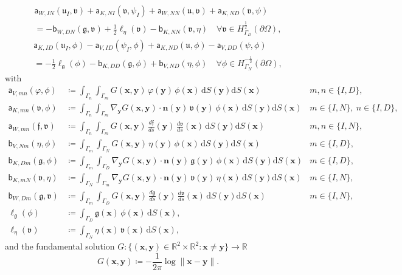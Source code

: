 \documentclass{article}
\theoremstyle{remark}
\newcommand{\aaa}{\mathsf{a}}
\newcommand{\bbb}{\mathsf{b}}
\newcommand{\x}{\boldsymbol{x}}
\newcommand{\y}{\boldsymbol{y}}
\newcommand{\dd}{\mathrm{d}}
\newcommand{\n}{\boldsymbol{n}}
\newcommand{\argu}{\mathfrak{u}}
\newcommand{\argv}{\mathfrak{v}}
\newcommand{\argf}{\mathfrak{f}}
\newcommand{\argg}{\mathfrak{g}}
\begin{document}
\begin{multline*}
    \aaa_{W,IN}(\argu_I,\argv)+\aaa_{K,NI}(\argv,\psi_I)+\aaa_{W,NN}(\argu,\argv)+\aaa_{K,ND}(\argv,\psi)\\
    =-\bbb_{W,DN}(\argg,\argv)+\frac{1}{2}\ell_\eta(\argv)-\bbb_{K,NN}(\argv,\eta)\quad
    \forall\argv\in H^{\frac{1}{2}}_{\Gamma_D}(\partial\Omega),
\end{multline*}
\begin{multline}
\label{eq:vf}
    \aaa_{K,ID}(\argu_I,\phi)-\aaa_{V,ID}(\psi_I,\phi)+\aaa_{K,ND}(\argu,\phi)-\aaa_{V,DD}(\psi,\phi)\\
    =-\frac{1}{2}\ell_\argg(\phi)-\bbb_{K,DD}(\argg,\phi)+\bbb_{V,ND}(\eta,\phi)\quad
    \forall\phi\in H^{-\frac{1}{2}}_{\Gamma_N}(\partial\Omega),
\end{multline}
with
\begin{equation}
\label{eq:opdef}
\begin{aligned}
    \aaa_{V,mn}(\varphi,\phi)&\coloneqq\int_{\Gamma_n}\int_{\Gamma_m}G(\x,\y)\,\varphi(\y)\,\phi(\x)\,\dd S(\y)\dd S(\x)
    &m, n\in\{I,D\},\\
    \aaa_{K,mn}(\argv,\phi)&\coloneqq\int_{\Gamma_n}\int_{\Gamma_m}\nabla_{\boldsymbol y} G(\x,\y)\cdot\n(\y)\,\argv(\y)\,\phi(\x)\,\dd S(\y)\dd S(\x)
    &m\in\{I,N\},~n\in\{I,D\},\\
    \aaa_{W,mn}(\argf,\argv)&\coloneqq\int_{\Gamma_n}\int_{\Gamma_m}G(\x,\y)\,\frac{d\argf}{ds}(\y)\,\frac{d\argv}{ds}(\x)\,\dd S(\y)\dd S(\x)
    &m, n\in\{I,N\},\\
    \bbb_{V,Nm}(\eta,\phi)&\coloneqq\int_{\Gamma_m}\int_{\Gamma_N}G(\x,\y)\,\eta(\y)\,\phi(\x)\,\dd S(\y)\dd S(\x)
    &m\in\{I,D\},\\
    \bbb_{K,Dm}(\argg,\phi)&\coloneqq\int_{\Gamma_m}\int_{\Gamma_D}\nabla_{\boldsymbol y} G(\x,\y)\cdot\n(\y)\,\argg(\y)\,\phi(\x)\,\dd S(\y)\dd S(\x)
    &m\in\{I,D\},\\
    \bbb_{K,mN}(\argv,\eta)&\coloneqq\int_{\Gamma_N}\int_{\Gamma_m}\nabla_{\boldsymbol y} G(\x,\y)\cdot\n(\y)\,\argv(\y)\,\eta(\x)\,\dd S(\y)\dd S(\x)
    &m\in\{I,N\},\\
    \bbb_{W,Dm}(\argg,\argv)&\coloneqq\int_{\Gamma_m}\int_{\Gamma_D}G(\x,\y)\,\frac{d\argg}{ds}(\y)\,\frac{d\argv}{ds}(\x)\,\dd S(\y)\dd S(\x)
    &m\in\{I,N\},\\
    \ell_{\argg}(\phi)&\coloneqq\int_{\Gamma_D}\argg(\x)\,\phi(\x)\,\dd S(\x),&\\
    \ell_{\eta}(\argv)&\coloneqq\int_{\Gamma_N}\eta(\x)\,\argv(\x)\,\dd S(\x),&
\end{aligned}
\end{equation}
and the fundamental solution $G:\{(\x,\y)\in\mathbb{R}^2\times\mathbb{R}^2:\x\neq\y\}\to\mathbb{R}$
\begin{equation}
    G(\x,\y)\coloneqq-\frac{1}{2\pi}\log\|\x-\y\|.
\end{equation}
\end{document}
